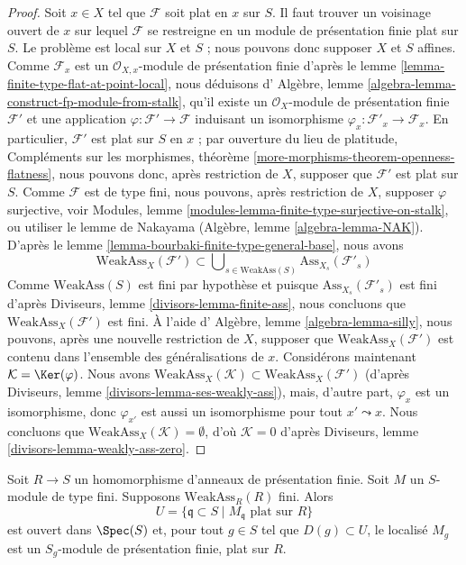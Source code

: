 \begin{proof}
Soit $x \in X$ tel que $\mathcal{F}$ soit plat en $x$ sur $S$.
Il faut trouver un voisinage ouvert de $x$ sur lequel $\mathcal{F}$ se restreigne
en un module de présentation finie plat sur $S$.
Le problème est local sur $X$ et $S$ ; nous pouvons donc supposer $X$ et $S$
affines. Comme $\mathcal{F}_x$ est un
$\mathcal{O}_{X, x}$-module de présentation finie d'après le
lemme \ref{lemma-finite-type-flat-at-point-local},
nous déduisons d'
Algèbre, lemme \ref{algebra-lemma-construct-fp-module-from-stalk},
qu'il existe un $\mathcal{O}_X$-module de présentation finie $\mathcal{F}'$
et une application $\varphi : \mathcal{F}' \to \mathcal{F}$ induisant
un isomorphisme $\varphi_x : \mathcal{F}'_x \to \mathcal{F}_x$. En particulier,
$\mathcal{F}'$ est plat sur $S$ en $x$ ; par ouverture
du lieu de platitude,
Compléments sur les morphismes, théorème \ref{more-morphisms-theorem-openness-flatness},
nous pouvons donc, après restriction de $X$, supposer que
$\mathcal{F}'$ est plat sur $S$. Comme $\mathcal{F}$ est de type fini,
nous pouvons, après restriction de $X$, supposer $\varphi$ surjective, voir
Modules, lemme \ref{modules-lemma-finite-type-surjective-on-stalk},
ou utiliser le lemme de Nakayama
(Algèbre, lemme \ref{algebra-lemma-NAK}).
D'après le
lemme \ref{lemma-bourbaki-finite-type-general-base},
nous avons
$$
\text{WeakAss}_X(\mathcal{F}') \subset
\bigcup\nolimits_{s \in \text{WeakAss}(S)} \text{Ass}_{X_s}(\mathcal{F}'_s)
$$
Comme $\text{WeakAss}(S)$ est fini par hypothèse et puisque
$\text{Ass}_{X_s}(\mathcal{F}'_s)$ est fini d'après
Diviseurs, lemme \ref{divisors-lemma-finite-ass},
nous concluons que $\text{WeakAss}_X(\mathcal{F}')$ est fini. À l'aide d'
Algèbre, lemme \ref{algebra-lemma-silly},
nous pouvons, après une nouvelle restriction de $X$, supposer que
$\text{WeakAss}_X(\mathcal{F}')$ est contenu dans l'ensemble des généralisations
de $x$. Considérons maintenant $\mathcal{K} = \Ker(\varphi)$. Nous avons
$\text{WeakAss}_X(\mathcal{K}) \subset \text{WeakAss}_X(\mathcal{F}')$
(d'après
Diviseurs, lemme \ref{divisors-lemma-ses-weakly-ass}),
mais, d'autre part, $\varphi_x$ est un isomorphisme, donc $\varphi_{x'}$
est aussi un isomorphisme pour tout $x' \leadsto x$. Nous concluons que
$\text{WeakAss}_X(\mathcal{K}) = \emptyset$, d'où
$\mathcal{K} = 0$ d'après
Diviseurs, lemme \ref{divisors-lemma-weakly-ass-zero}.
\end{proof}

\begin{lemma}
\label{lemma-finite-type-flat-algebra}
Soit $R \to S$ un homomorphisme d'anneaux de présentation finie.
Soit $M$ un $S$-module de type fini. Supposons $\text{WeakAss}_R(R)$ fini.
Alors
$$
U = \{\mathfrak q \subset S \mid M_{\mathfrak q}\text{ plat sur }R\}
$$
est ouvert dans $\Spec(S)$ et, pour tout $g \in S$ tel que
$D(g) \subset U$, le localisé $M_g$ est un
$S_g$-module de présentation finie, plat sur $R$.
\end{lemma}

